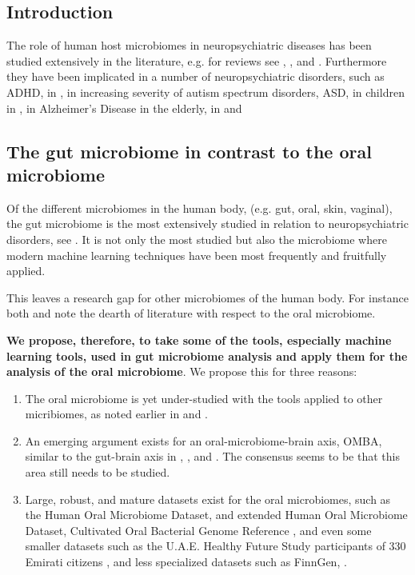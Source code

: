\documentclass{article}
\begin{document}
\begin{multicols}{2}
\section{Introduction}
The role of human host microbiomes in neuropsychiatric diseases has been studied extensively in the literature, e.g. for reviews see \cite{goswami_role_2021}, \cite{hashimoto_emerging_2023}, and \cite{bonnechere}. Furthermore they have been implicated in a number of neuropsychiatric disorders, such as ADHD, in \cite{bull-larsen_potential_2019}, in increasing severity of autism spectrum disorders, ASD, in children in \cite{TOMOVA2015179}, in Alzheimer's Disease in the elderly, in \cite{yk_microbiota-gut-brain_2018} and \cite{escobar_influence_2022}
\subsection{The gut microbiome in contrast to the oral microbiome}
Of the different microbiomes in the human body, (e.g. gut, oral, skin, vaginal), the gut microbiome is the most extensively studied in relation to neuropsychiatric disorders, see \cite{sorboni_comprehensive_2022}. It is not only the most studied but also the microbiome where modern machine learning techniques have been most frequently and fruitfully applied. 

This leaves a research gap for other microbiomes of the human body. For instance both \cite{goswami_role_2021} and \cite{tao_relationship_2024} note the dearth of literature with respect to the oral microbiome.

\textbf{We propose, therefore, to take some of the tools, especially machine learning tools, used in gut microbiome analysis and apply them for the analysis of the oral microbiome}. We propose this for three reasons:

\begin{enumerate}[label = \roman*.]
	\item The oral microbiome is yet under-studied with the tools applied to other micribiomes, as noted earlier in \cite{goswami_role_2021} and \cite{tao_relationship_2024}.
	\item An emerging argument exists for an oral-microbiome-brain axis, OMBA, similar to the gut-brain axis in \cite{bowland_oral-microbiome-brain_2022}, \cite{xi_coming_2024}, and \cite{y_did_2020}. The consensus seems to be that this area still needs to be studied.
	\item Large, robust, and mature datasets exist for the oral microbiomes, such as the Human Oral Microbiome Dataset, and extended Human Oral Microbiome Dataset\cite{homd}, Cultivated Oral Bacterial Genome Reference \cite{li_catalog_2023}, and even some smaller datasets such as the U.A.E. Healthy Future Study participants of 330 Emirati citizens \cite{noauthor_human_nodate}, and less specialized datasets such as FinnGen, \cite{noauthor_finngen_nodate}.
\end{enumerate}

\end{multicols}
\end{document}
